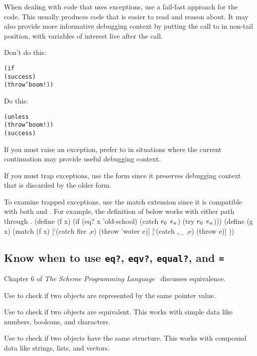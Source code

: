 \documentclass[letterpaper,11pt,twoside,final]{article}
\begin{document}
When dealing with code that uses exceptions, use a fail-fast approach
for the code. This usually produces code that is easier to read and
reason about.
It may also provide more informative debugging context by putting
the call to  in non-tail position, with variables of
interest live after the call.

Don't do this:
\antipar
\begin{alltt}
(if 
    (success)
    (throw 'boom!))
\end{alltt}

Do this:
\antipar
\begin{alltt}
(unless 
  (throw 'boom!))
(success)
\end{alltt}

If you must raise an exception, prefer  to  in
situations where the current continuation may provide useful debugging
context.

If you must trap exceptions, use the  form since it preserves
debugging context that is discarded by the older  form.

To examine trapped exceptions, use the  match extension since
it is compatible with both  and .
For example, the definition of  below works with either
path through .
\codebegin
(define (f x)
  (if (eq? x 'old-school)
      (catch \(e\sb{0}\) \etc{} \(e\sb{n}\))
      (try \(e\sb{0}\) \etc{} \(e\sb{n}\))))
(define (g x)
  (match (f x)
    [`(catch fire ,e) (throw 'water e)]
    [`(catch ,_ ,e) (throw e)]
    \etc))
\codeend

\subsection* {Know when to use \texttt{eq?}, \texttt{eqv?},
  \texttt{equal?}, and \texttt{=}}

Chapter 6 of \emph{The Scheme Programming
  Language}~\cite{the-scheme-programming-language} discusses
equivalence.

Use  to check if two objects are represented by the same
pointer value.

Use  to check if two objects are equivalent. This works
with simple data like numbers, booleans, and characters.

Use  to check if two objects have the same
structure. This works with compound data like strings, lists, and
vectors.
\end{document}
